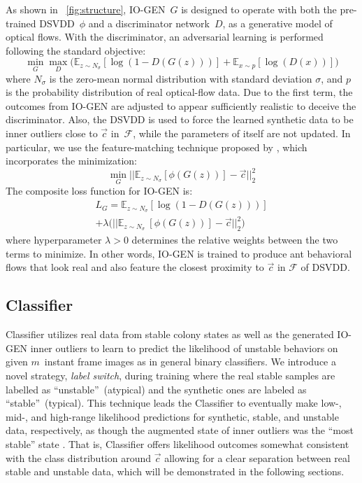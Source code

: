 \documentclass[letterpaper]{article} %
\let\orgautoref\autoref
\renewcommand{\autoref}
{\def\equationautorefname{Equation}%
\def\figureautorefname{Fig.}%
\def\subfigureautorefname{Fig.}%
\def\Itemautorefname{item}%
\def\tableautorefname{Table}%
\def\exerciseautorefname{Exercise}%
\def\starexerciseautorefname{Exercise}%
\def\sectionautorefname{Section}%
\def\subsectionautorefname{Section}%
\def\subsubsectionautorefname{Section}%
\def\chapterautorefname{Section}%
\def\partautorefname{Part}%
\orgautoref}
\begin{document}
As shown in~\autoref{fig:structure}, \mbox{IO-GEN}~$G$ is designed to operate
with both the pre-trained DSVDD~$\phi$ and a discriminator network~$D$,
as a generative model of optical flows. With the discriminator, an
adversarial learning is performed following the standard objective:
\begin{equation*}
\label{eq:obj1}
\min_{G} \max_{D}
\Big( \mathbb{E}_{z \sim \mathit{N_{\sigma}}} [\log(1 - D(G(z)))]
+ \mathbb{E}_{x \sim p} [\log(D(x))] \Big)
\end{equation*}
where $\mathit{N_{\sigma}}$ is the zero-mean normal distribution with
standard deviation $\sigma$, and $p$ is the probability distribution of
real optical-flow data. Due to the first term, the outcomes from
\mbox{IO-GEN} are adjusted to appear sufficiently realistic to deceive the
discriminator. Also, the DSVDD is used to force the learned synthetic
data to be inner outliers close to $\vec{c}$ in~$\mathcal{F}$, while the
parameters of itself are not updated. In particular, we use the
feature-matching technique proposed by \citet{SGZCRC16}, which
incorporates the minimization:
\begin{equation*}
\label{eq:obj2}
\min_{G}
|| \mathbb{E}_{z \sim \mathit{N_{\sigma}}} [\phi(G(z))]
- \vec{c} ||^{2}_{2}
\end{equation*}
The composite loss function for \mbox{IO-GEN} is:
\begin{multline*}
\label{eq:loss}
\mathit{L}_{G} =
\mathbb{E}_{z \sim \mathit{N_{\sigma}}} [\log(1 - D(G(z)))] \\
+ \lambda \Big( || \mathbb{E}_{z \sim \mathit{N_{\sigma}}} \
[\phi(G(z))] - \vec{c} ||^{2}_{2} \Big)
\end{multline*}
where hyperparameter $\lambda > 0$ determines the relative
weights between the two terms to minimize. In other words, \mbox{IO-GEN} is
trained to produce ant behavioral flows that look real and
also feature the closest proximity to $\vec{c}$ in $\mathcal{F}$ of
DSVDD.

\subsection{Classifier}
\label{sec:classifier}

Classifier utilizes real data from stable colony states as well as the
generated \mbox{IO-GEN} inner outliers to learn to predict the likelihood of
unstable behaviors on given $m$~instant frame images as in general
binary classifiers. We introduce a novel strategy, \emph{label switch}, during
training where the real stable samples are labelled as
``unstable''~(atypical) and the synthetic ones are labeled as
``stable''~(typical). This technique leads the Classifier to eventually
make \mbox{low-,} \mbox{mid-,} and high-range likelihood predictions for synthetic,
stable, and unstable data, respectively, as though the augmented state
of inner outliers was the ``most stable'' state . That is, Classifier
offers likelihood outcomes somewhat consistent with the class
distribution around $\vec{c}$ allowing for a clear separation between
real stable and unstable data, which will be demonstrated in
the following sections.
\end{document}
